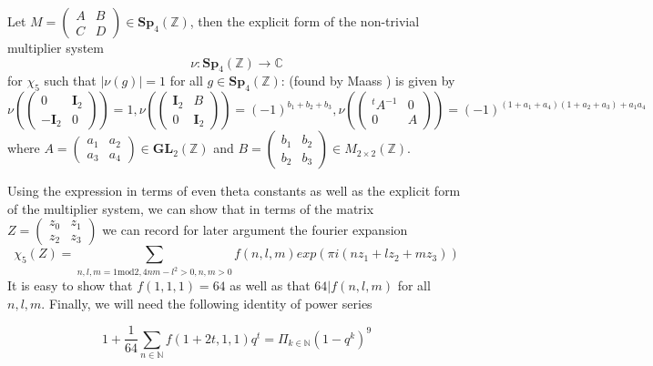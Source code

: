 \documentclass[9pt]{amsart} \usepackage[utf8]{inputenc}
\newcommand{\Z}{\mathbb{Z}} \newcommand{\C}{\mathbb{C}}
\newcommand{\Sp}{\mathbf{Sp}}
\newcommand{\GL}{\mathbf{GL}}
\newcommand{\Id}{\mathbf{I}}
\begin{document}
Let $M = \begin{pmatrix} A & B\\
C & D\end{pmatrix} \in \Sp_4(\Z)$, then the explicit form of the
non-trivial multiplier system $$\nu:
\Sp_4(\Z) \rightarrow \C$$ for $\chi_5$
such that $|\nu(g)| = 1$ for all $g \in \Sp_4(\Z)$:
(found by Maass \cite{MAASS:1}) is given by
$$\nu(\begin{pmatrix}0 & \Id_2\\
-\Id_2 & 0\end{pmatrix}) = 1, \nu(\begin{pmatrix}\Id_2 & B\\
0 & \Id_2\end{pmatrix}) = (-1)^{b_1 + b_2 + b_3},
\nu(\begin{pmatrix}{}^tA^{-1} & 0\\
0 & A\end{pmatrix}) = (-1)^{(1 + a_1 + a_4)(1 + a_2 + a_3) + a_1a_4}$$
where $A = \begin{pmatrix}a_1 & a_2\\
a_3 & a_4\end{pmatrix} \in \GL_2(\Z)$ and $B = \begin{pmatrix}b_1 &
b_2\\
b_2 & b_3\end{pmatrix} \in M_{2\times2}(\Z).$



Using the expression in terms of even theta constants as well as the
explicit form of the multiplier system, we can show that
in terms of the matrix $Z=\begin{pmatrix}z_0 & z_1\\ z_2 &
z_3\end{pmatrix}$ we can
record for later argument the fourier expansion $$\chi_5(Z) =
\sum_{n,l,m = 1 \textrm{mod} 2, 4nm - l^2 > 0, n,m > 0} f(n,l,m)exp(\pi
i(n z_1 + l z_2 + mz_3))$$ It is easy to show that $f(1,1,1) =64$ as
well as that $64 | f(n,l,m)$ for all $n,l,m$.  Finally, we
will need the following identity of power series

$$1 + \frac{1}{64} \sum_{n\in \mathbb{N}} f(1+2t, 1, 1)q^t = \Pi_{k\in
\mathbb{N}}(1 - q^k)^9$$
\end{document}
